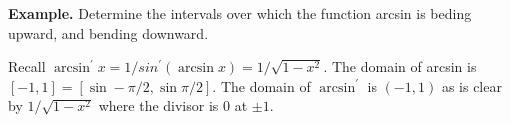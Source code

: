           \textbf{Example.} Determine the intervals over which the function arcsin is beding upward, and bending downward.

          Recall $\arcsin^\prime x = 1/sin^\prime(\arcsin x) = 1/\sqrt{1 - x^2}$. The domain of arcsin is $[-1, 1] = [\sin -\pi/2, \sin \pi/2]$. The domain of $\arcsin^\prime$ is $(-1, 1)$ as is clear by $1/\sqrt{1 - x^2}$ where the divisor is $0$ at $\pm 1$.
